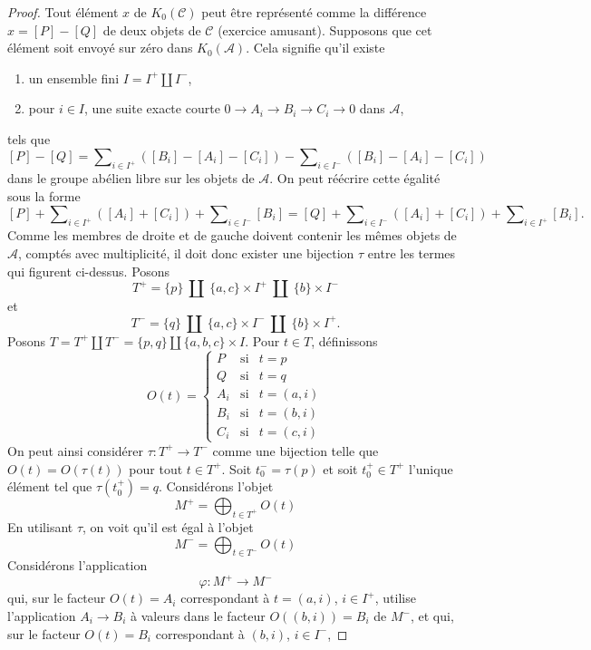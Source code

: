 \begin{proof}
\medskip\noindent
Tout élément $x$ de $K_0(\mathcal{C})$ peut être représenté comme la
différence $x = [P] - [Q]$ de deux objets de $\mathcal{C}$ (exercice amusant).
Supposons que cet élément soit envoyé sur zéro dans $K_0(\mathcal{A})$.
Cela signifie qu'il existe
\begin{enumerate}
\item un ensemble fini $I = I^{+} \amalg I^{-}$,
\item pour $i \in I$, une suite exacte courte $0 \to A_i \to B_i \to C_i \to 0$
dans $\mathcal{A}$,
\end{enumerate}
tels que
$$
[P] - [Q] =
\sum\nolimits_{i \in I^{+}} ([B_i] - [A_i] - [C_i])
-
\sum\nolimits_{i \in I^{-}} ([B_i] - [A_i] - [C_i])
$$
dans le groupe abélien libre sur les objets de $\mathcal{A}$.
On peut réécrire cette égalité sous la forme
$$
[P]
+ \sum\nolimits_{i \in I^{+}} ([A_i] + [C_i])
+ \sum\nolimits_{i \in I^{-}} [B_i]
=
[Q]
+ \sum\nolimits_{i \in I^{-}} ([A_i] + [C_i])
+ \sum\nolimits_{i \in I^{+}} [B_i].
$$
Comme les membres de droite et de gauche doivent contenir les mêmes objets
de $\mathcal{A}$, comptés avec multiplicité, il doit donc exister
une bijection $\tau$ entre les termes qui figurent ci-dessus. Posons
$$
T^{+} =
\{p\}\ \amalg\ \{a, c\} \times I^{+}\ \amalg\ \{b\} \times I^{-}
$$
et
$$
T^{-} =
\{q\}\ \amalg\ \{a, c\} \times I^{-}\ \amalg\ \{b\} \times I^{+}.
$$
Posons $T = T^{+} \amalg T^{-} = \{p, q\} \amalg \{a, b, c\} \times I$.
Pour $t \in T$, définissons
$$
O(t)
=
\left\{
\begin{matrix}
P & \text{si} & t = p \\
Q & \text{si} & t = q \\
A_i & \text{si} & t = (a, i) \\
B_i & \text{si} & t = (b, i) \\
C_i & \text{si} & t = (c, i)
\end{matrix}
\right.
$$
On peut ainsi considérer $\tau : T^{+} \to T^{-}$ comme une bijection
telle que $O(t) = O(\tau(t))$ pour tout $t \in T^{+}$.
Soit $t^{-}_0 = \tau(p)$ et soit $t^{+}_0 \in T^{+}$ l'unique
élément tel que $\tau(t^{+}_0) = q$.
Considérons l'objet
$$
M^{+} = \bigoplus\nolimits_{t \in T^{+}} O(t)
$$
En utilisant $\tau$, on voit qu'il est égal à l'objet
$$
M^{-} = \bigoplus\nolimits_{t \in T^{-}} O(t)
$$
Considérons l'application
$$
\varphi : M^{+} \longrightarrow M^{-}
$$
qui, sur le facteur $O(t) = A_i$ correspondant à $t = (a, i)$, $i \in I^{+}$,
utilise l'application $A_i \to B_i$ à valeurs dans le facteur $O((b, i)) = B_i$ de $M^{-}$,
et qui, sur le facteur $O(t) = B_i$ correspondant à $(b, i)$, $i \in I^{-}$,

\end{proof}

